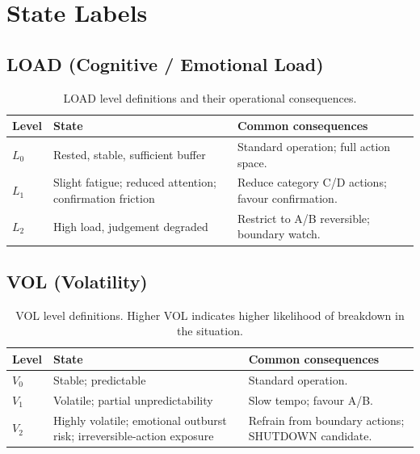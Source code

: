 \section{State Labels}
\label{sec:hstn-state-labels}

\subsection{LOAD (Cognitive / Emotional Load)}
\label{sec:hstn-load}

\begin{table}[ht]
\centering
\small
\begin{tabularx}{\linewidth}{lXX}
\toprule
\textbf{Level} & \textbf{State} & \textbf{Common consequences} \\
\midrule
$L_0$
& Rested, stable, sufficient buffer
& Standard operation; full action space. \\

$L_1$
& Slight fatigue; reduced attention; confirmation friction
& Reduce category C/D actions; favour confirmation. \\

$L_2$
& High load, judgement degraded
& Restrict to A/B reversible; boundary watch. \\
\bottomrule
\end{tabularx}
\caption[HST-N LOAD levels]{LOAD level definitions and their
operational consequences.}
\label{tab:hstn-load}
\end{table}

\subsection{VOL (Volatility)}
\label{sec:hstn-vol}

\begin{table}[ht]
\centering
\small
\begin{tabularx}{\linewidth}{lXX}
\toprule
\textbf{Level} & \textbf{State} & \textbf{Common consequences} \\
\midrule
$V_0$
& Stable; predictable
& Standard operation. \\

$V_1$
& Volatile; partial unpredictability
& Slow tempo; favour A/B. \\

$V_2$
& Highly volatile; emotional outburst risk; irreversible-action
exposure
& Refrain from boundary actions; SHUTDOWN candidate. \\
\bottomrule
\end{tabularx}
\caption[HST-N VOL levels]{VOL level definitions. Higher VOL
indicates higher likelihood of breakdown in the situation.}
\label{tab:hstn-vol}
\end{table}

